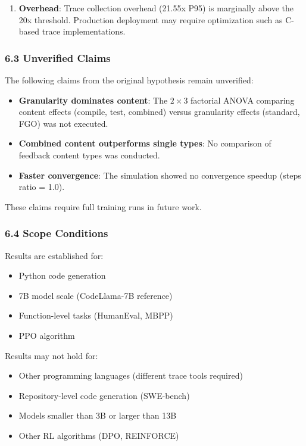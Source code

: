 \begin{enumerate}
\item \textbf{Overhead}: Trace collection overhead (21.55x P95) is marginally above the 20x threshold. Production deployment may require optimization such as C-based trace implementations.
\end{enumerate}

\subsubsection{6.3 Unverified Claims}

The following claims from the original hypothesis remain unverified:

\begin{itemize}
\item \textbf{Granularity dominates content}: The $2\times 3$ factorial ANOVA comparing content effects (compile, test, combined) versus granularity effects (standard, FGO) was not executed.
\end{itemize}

\begin{itemize}
\item \textbf{Combined content outperforms single types}: No comparison of feedback content types was conducted.
\end{itemize}

\begin{itemize}
\item \textbf{Faster convergence}: The simulation showed no convergence speedup (steps ratio = 1.0).
\end{itemize}

These claims require full training runs in future work.

\subsubsection{6.4 Scope Conditions}

Results are established for:
\begin{itemize}
\item Python code generation
\item 7B model scale (CodeLlama-7B reference)
\item Function-level tasks (HumanEval, MBPP)
\item PPO algorithm
\end{itemize}

Results may not hold for:
\begin{itemize}
\item Other programming languages (different trace tools required)
\item Repository-level code generation (SWE-bench)
\item Models smaller than 3B or larger than 13B
\item Other RL algorithms (DPO, REINFORCE)
\end{itemize}
